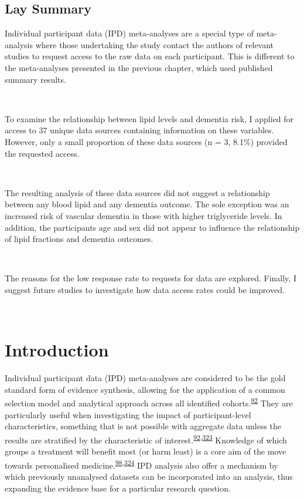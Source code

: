 \documentclass[a4paper, twoside]{templates/ociamthesis}
\begin{document}
\begin{laybox}

\hypertarget{lay-summary-5}{%
\section*{Lay Summary}\label{lay-summary-5}}

Individual participant data (IPD) meta-analyses are a special type of meta-analysis where those undertaking the study contact the authors of relevant studies to request access to the raw data on each participant. This is different to the meta-analyses presented in the previous chapter, which used published summary results.

~

To examine the relationship between lipid levels and dementia risk, I applied for access to 37 unique data sources containing information on these variables. However, only a small proportion of these data sources (n = 3, 8.1\%) provided the requested access.

~

The resulting analysis of these data sources did not suggest a relationship between any blood lipid and any dementia outcome. The sole exception was an increased risk of vascular dementia in those with higher triglyceride levels. In addition, the participants age and sex did not appear to influence the relationship of lipid fractions and dementia outcomes.

~

The reasons for the low response rate to requests for data are explored. Finally, I suggest future studies to investigate how data access rates could be improved.

\end{laybox}

~

\hypertarget{introduction-3}{%
\section{Introduction}\label{introduction-3}}

Individual participant data (IPD) meta-analyses are considered to be the gold standard form of evidence synthesis, allowing for the application of a common selection model and analytical approach across all identified cohorts.\textsuperscript{\protect\hyperlink{ref-riley2010}{92}} They are particularly useful when investigating the impact of participant-level characteristics, something that is not possible with aggregate data unless the results are stratified by the characteristic of interest.\textsuperscript{\protect\hyperlink{ref-riley2010}{92},\protect\hyperlink{ref-thompson2005}{323}} Knowledge of which groups a treatment will benefit most (or harm least) is a core aim of the move towards personalised medicine.\textsuperscript{\protect\hyperlink{ref-riley2020}{98},\protect\hyperlink{ref-hingorani2013}{324}}
IPD analysis also offer a mechanism by which previously unanalysed datasets can be incorporated into an analysis, thus expanding the evidence base for a particular research question.
\end{document}
